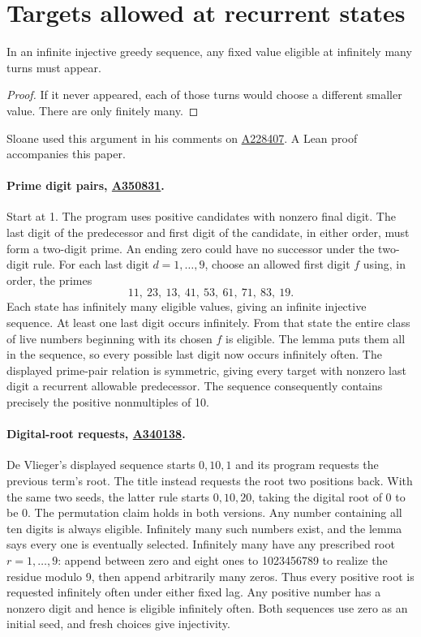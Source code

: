 \documentclass[11pt]{article}
\newcommand{\seqref}[1]{\href{https://oeis.org/#1}{#1}}
\begin{document}
\section{Targets allowed at recurrent states}
\begin{lemma}\label{recur}In an infinite injective greedy sequence, any fixed value eligible at infinitely many turns must appear.\end{lemma}
\begin{proof}If it never appeared, each of those turns would choose a different smaller value. There are only finitely many.\end{proof}
Sloane used this argument in his comments on \seqref{A228407}. A Lean proof accompanies this paper.

\paragraph{Prime digit pairs, \seqref{A350831}.} Start at 1. The program uses positive candidates with nonzero final digit. The last digit of the predecessor and first digit of the candidate, in either order, must form a two-digit prime. An ending zero could have no successor under the two-digit rule. For each last digit $d=1,\ldots,9$, choose an allowed first digit $f$ using, in order, the primes
\[
 11,\ 23,\ 13,\ 41,\ 53,\ 61,\ 71,\ 83,\ 19.
\]
Each state has infinitely many eligible values, giving an infinite injective sequence. At least one last digit occurs infinitely. From that state the entire class of live numbers beginning with its chosen $f$ is eligible. The lemma puts them all in the sequence, so every possible last digit now occurs infinitely often. The displayed prime-pair relation is symmetric, giving every target with nonzero last digit a recurrent allowable predecessor. The sequence consequently contains precisely the positive nonmultiples of 10.

\paragraph{Digital-root requests, \seqref{A340138}.} De Vlieger's displayed sequence starts $0,10,1$ and its program requests the previous term's root. The title instead requests the root two positions back. With the same two seeds, the latter rule starts $0,10,20$, taking the digital root of 0 to be 0. The permutation claim holds in both versions. Any number containing all ten digits is always eligible. Infinitely many such numbers exist, and the lemma says every one is eventually selected. Infinitely many have any prescribed root $r=1,\ldots,9$: append between zero and eight ones to 1023456789 to realize the residue modulo 9, then append arbitrarily many zeros. Thus every positive root is requested infinitely often under either fixed lag. Any positive number has a nonzero digit and hence is eligible infinitely often. Both sequences use zero as an initial seed, and fresh choices give injectivity.
\end{document}
